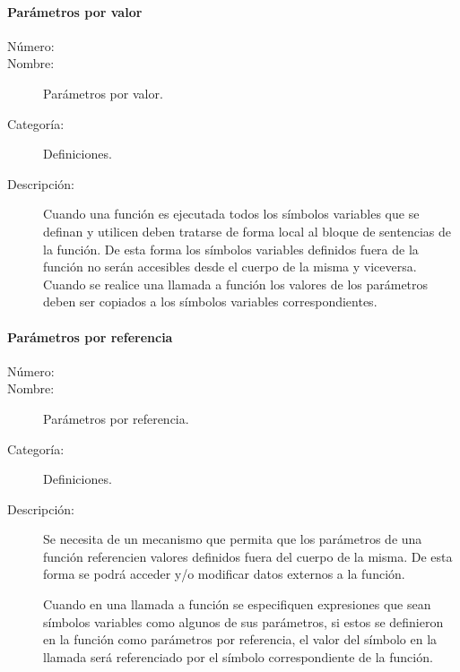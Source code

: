 \paragraph{Parámetros por valor}
\begin{framed}
	\begin{description}
		\item [Número:] \cn
		\item [Nombre:] Parámetros por valor.
		\item [Categoría:] Definiciones.
		\item [Descripción:] Cuando una función es ejecutada todos los símbolos variables que se definan y utilicen deben tratarse de forma 
		local al bloque de sentencias de la función. De esta forma los símbolos variables definidos fuera de la función no serán accesibles
		desde el cuerpo de la misma y viceversa. Cuando se realice una llamada a función los valores de los parámetros deben ser copiados
		a los símbolos variables correspondientes.
	\end{description}
\end{framed}

\paragraph{Parámetros por referencia}
\begin{framed}
	\begin{description}
		\item [Número:] \cn
		\item [Nombre:] Parámetros por referencia.
		\item [Categoría:] Definiciones.
		\item [Descripción:] Se necesita de un mecanismo que permita que los parámetros de una función referencien valores definidos 
		fuera del cuerpo de la misma. De esta forma se podrá acceder y/o modificar datos externos a la función. 
		
		Cuando en una llamada a función se especifiquen expresiones que sean símbolos variables como algunos de sus parámetros, si estos se definieron en la
		función como parámetros por referencia, el valor del símbolo en la llamada será referenciado por el símbolo correspondiente de la función.
	\end{description}
\end{framed}

